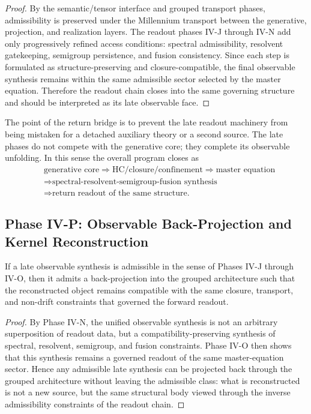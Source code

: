 \begin{proof}
By the semantic/tensor interface and grouped transport phases, admissibility is preserved under the Millennium transport between the generative, projection, and realization layers. The readout phases IV-J through IV-N add only progressively refined access conditions: spectral admissibility, resolvent gatekeeping, semigroup persistence, and fusion consistency. Since each step is formulated as structure-preserving and closure-compatible, the final observable synthesis remains within the same admissible sector selected by the master equation. Therefore the readout chain closes into the same governing structure and should be interpreted as its late observable face.
\end{proof}

\begin{remark}
The point of the return bridge is to prevent the late readout machinery from being mistaken for a detached auxiliary theory or a second source. The late phases do not compete with the generative core; they complete its observable unfolding. In this sense the overall program closes as
\[
\begin{aligned}
&\text{generative core}
\Longrightarrow \text{HC/closure/confinement}
\Longrightarrow \text{master equation}
\\
&\Longrightarrow \text{spectral-resolvent-semigroup-fusion synthesis}
\\
&\Longrightarrow \text{return readout of the same structure.}
\end{aligned}
\]
\end{remark}


\subsection*{Phase IV-P: Observable Back-Projection and Kernel Reconstruction}

\begin{lemma}\label{lem:admissible_back_projection}
If a late observable synthesis is admissible in the sense of Phases IV-J through IV-O, then it admits a back-projection into the grouped architecture such that the reconstructed object remains compatible with the same closure, transport, and non-drift constraints that governed the forward readout.
\end{lemma}
\begin{proof}
By Phase IV-N, the unified observable synthesis is not an arbitrary superposition of readout data, but a compatibility-preserving synthesis of spectral, resolvent, semigroup, and fusion constraints. Phase IV-O then shows that this synthesis remains a governed readout of the same master-equation sector. Hence any admissible late synthesis can be projected back through the grouped architecture without leaving the admissible class: what is reconstructed is not a new source, but the same structural body viewed through the inverse admissibility constraints of the readout chain.
\end{proof}

